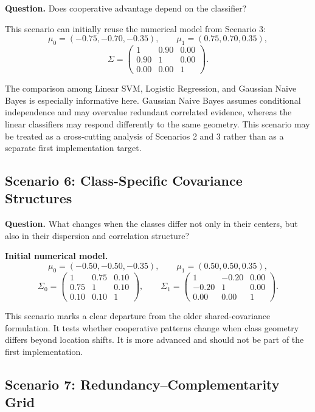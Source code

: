 \documentclass[11pt,a4paper]{article}
\begin{document}
\textbf{Question.} Does cooperative advantage depend on the classifier?

This scenario can initially reuse the numerical model from Scenario 3:
\[
    \mu_0=(-0.75,-0.70,-0.35),
    \qquad
    \mu_1=(0.75,0.70,0.35),
\]
\[
\Sigma=
\begin{pmatrix}
1 & 0.90 & 0.00\\
0.90 & 1 & 0.00\\
0.00 & 0.00 & 1
\end{pmatrix}.
\]

The comparison among Linear SVM, Logistic Regression, and Gaussian Naive Bayes is especially informative here. Gaussian Naive Bayes assumes conditional independence and may overvalue redundant correlated evidence, whereas the linear classifiers may respond differently to the same geometry. This scenario may be treated as a cross-cutting analysis of Scenarios 2 and 3 rather than as a separate first implementation target.

\subsection{Scenario 6: Class-Specific Covariance Structures}

\textbf{Question.} What changes when the classes differ not only in their centers, but also in their dispersion and correlation structure?

\textbf{Initial numerical model.}
\[
    \mu_0=(-0.50,-0.50,-0.35),
    \qquad
    \mu_1=(0.50,0.50,0.35),
\]
\[
\Sigma_0=
\begin{pmatrix}
1 & 0.75 & 0.10\\
0.75 & 1 & 0.10\\
0.10 & 0.10 & 1
\end{pmatrix},
\qquad
\Sigma_1=
\begin{pmatrix}
1 & -0.20 & 0.00\\
-0.20 & 1 & 0.00\\
0.00 & 0.00 & 1
\end{pmatrix}.
\]

This scenario marks a clear departure from the older shared-covariance formulation. It tests whether cooperative patterns change when class geometry differs beyond location shifts. It is more advanced and should not be part of the first implementation.

\subsection{Scenario 7: Redundancy--Complementarity Grid}
\end{document}
